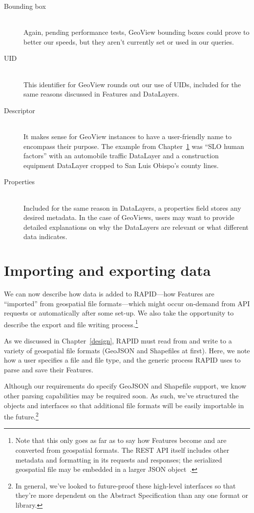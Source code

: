 \begin{description}
\item[Bounding box] \hfill \\
Again, pending performance tests, GeoView bounding boxes could prove to better our speeds, but they aren't currently set or used in our queries.

\item[UID] \hfill \\
This identifier for GeoView rounds out our use of UIDs, included for the same reasons discussed in Features and DataLayers.

\item[Descriptor] \hfill \\
It makes sense for GeoView instances to have a user-friendly name to encompass their purpose. The example from Chapter~\ref{} was ``SLO human factors'' with an automobile traffic DataLayer and a construction equipment DataLayer cropped to San Luis Obispo's county lines.

\item[Properties] \hfill \\
Included for the same reason in DataLayers, a properties field stores any desired metadata. In the case of GeoViews, users may want to provide detailed explanations on why the DataLayers are relevant or what different data indicates.

\end{description}


\section{Importing and exporting data}
We can now describe how data is added to RAPID---how Features are ``imported'' from geospatial file formats---which might occur on-demand from API requests or automatically after some set-up. We also take the opportunity to describe the export and file writing process.\footnote{Note that this only goes as far as to say how Features become and are converted from geospatial formats. The REST API itself includes other metadata and formatting in its requests and responses; the serialized geospatial file may be embedded in a larger JSON object~\cite{}.}

As we discussed in Chapter~\ref{design}, RAPID must read from and write to a variety of geospatial file formats (GeoJSON and Shapefiles at first). Here, we note how a user specifies a file and file type, and the generic process RAPID uses to parse and save their Features.

Although our requirements do specify GeoJSON and Shapefile support, we know other parsing capabilities may be required soon. As such, we've structured the objects and interfaces so that additional file formats will be easily importable in the future.\footnote{In general, we've looked to future-proof these high-level interfaces so that they're more dependent on the Abstract Specification than any one format or library.}

